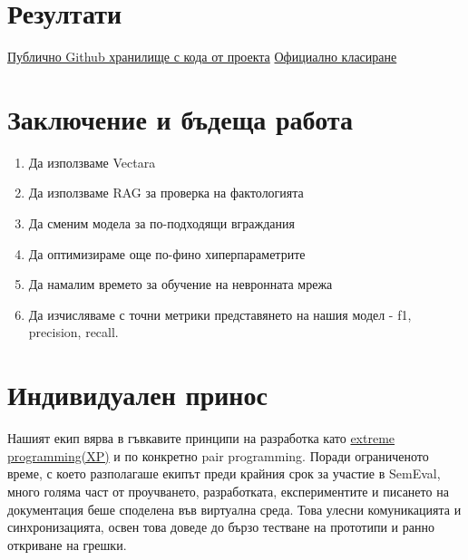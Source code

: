 \documentclass[12pt]{article}
\begin{document}
	\section{Резултати}
	
	\href{https://github.com/Kr1s1m/SemEval-2025_Task-3/}{Публично Github хранилище с кода от проекта} 
	\href{https://mushroomeval.pythonanywhere.com/submission/}{Официално класиране}
	
	\section{Заключение и бъдеща работа}
	
	\begin{enumerate}    
		\item[\textbullet] Да използваме Vectara  
		\item[\textbullet] Да използваме RAG за проверка на фактологията
		\item[\textbullet] Да сменим модела за по-подходящи вграждания
		\item[\textbullet] Да оптимизираме още по-фино хиперпараметрите
		\item[\textbullet] Да намалим времето за обучение на невронната мрежа
		\item[\textbullet] Да изчисляваме с точни метрики представянето на нашия модел - f1, precision, recall.

	\end{enumerate}

	\section{Индивидуален принос}
	
	Нашият екип вярва в гъвкавите принципи на разработка като  \href{https://asana.com/resources/extreme-programming-xp}{extreme programming(XP)} и по конкретно pair programming. Поради ограниченото време, с което разполагаше екипът преди крайния срок за участие в SemEval, много голяма част от проучването, разработката, експериментите и писането на документация беше споделена във виртуална среда. Това улесни комуникацията и синхронизацията, освен това доведе до бързо тестване на прототипи и ранно откриване на грешки.
	
\end{document}
